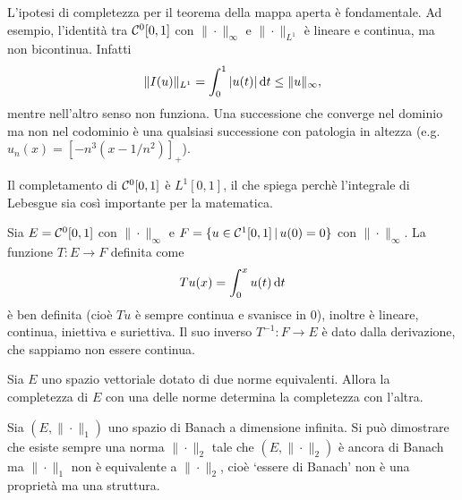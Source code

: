 \begin{remark}
	L'ipotesi di completezza per il teorema della mappa aperta è fondamentale. Ad esempio, l'identità tra $\mathcal{C}^0[0,1]$ con $\|\cdot\|_\infty$ e $\|\cdot\|_{L^1}$ è lineare e continua, ma non bicontinua. Infatti
	\begin{equation*}
		\|I(u)\|_{L^1} = \int_0^1 |u(t)|\,\mathrm{d}t \leq \|u\|_\infty,
	\end{equation*}
	mentre nell'altro senso non funziona. Una successione che converge nel dominio ma non nel codominio è una qualsiasi successione con patologia in altezza (e.g. $u_n(x) = [-n^3(x-1/n^2)]_+$).
\end{remark}

Il completamento di $\mathcal{C}^0[0,1]$ è $L^1[0,1]$, il che spiega perchè l'integrale di Lebesgue sia così importante per la matematica.

\begin{example}
	Sia $E = \mathcal{C}^0[0,1]$ con $\|\cdot\|_\infty$ e $F = \{ u \in \mathcal{C}^1[0,1] \,|\, u(0) = 0\}$ con $\|\cdot\|_\infty$.
	La funzione $T:E \to F$ definita come
	\begin{equation*}
		Tu (x) = \int_0^x u(t)\,\mathrm{d}t
	\end{equation*}
	è ben definita (cioè $Tu$ è sempre continua e svanisce in $0$), inoltre è lineare, continua, iniettiva e suriettiva. Il suo inverso $T^{-1} : F \to E$ è dato dalla derivazione, che sappiamo non essere continua.
\end{example}

\begin{corollary}
	Sia $E$ uno spazio vettoriale dotato di due norme equivalenti.
	Allora la completezza di $E$ con una delle norme determina la completezza con l'altra.
\end{corollary}

\begin{remark}
	Sia $(E, \|\cdot\|_1)$ uno spazio di Banach a dimensione infinita.
	Si può dimostrare che esiste sempre una norma $\|\cdot\|_2$ tale che $(E, \|\cdot\|_2)$ è ancora di Banach ma $\|\cdot\|_1$ non è equivalente a $\|\cdot\|_2$, cioè  `essere di Banach' non è una proprietà ma una struttura.
\end{remark}

